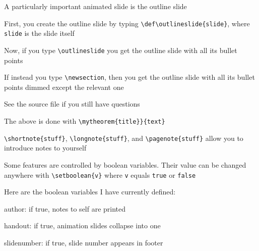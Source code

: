 \documentclass[11pt]{article}
\begin{document}
\newsection

\begin{list1}
    \item A particularly important animated slide is the outline slide
    \item First, you create the outline slide by typing \verb|\def\outlineslide{slide}|, where \verb|slide| is the slide itself
    \item Now, if you type \verb|\outlineslide| you get the outline slide with all its bullet points
    \item If instead you type \verb|\newsection|, then you get the outline slide with all its bullet points dimmed except the relevant one
    \item See the source file if you still have questions
\end{list1}
\slidefooter

\begin{list1}
    \item The above is done with \verb|\mytheorem{title}}{text}|
    \item \verb|\shortnote{stuff}|, \verb|\longnote{stuff}|, and \verb|\pagenote{stuff}| allow you to introduce notes to yourself 
    \item Some features are controlled by boolean variables.  Their value can be changed anywhere with \verb|\setboolean{v}| where \verb|v| equals \verb|true| or \verb|false|
    \item Here are the boolean variables I have currently defined:
        \begin{list2}
            \item author: if true, notes to self are printed
            \item handout: if true, animation slides collapse into one
            \item slidenumber: if true, slide number appears in footer
        \end{list2}
\end{list1}


\newsection
\end{document}
